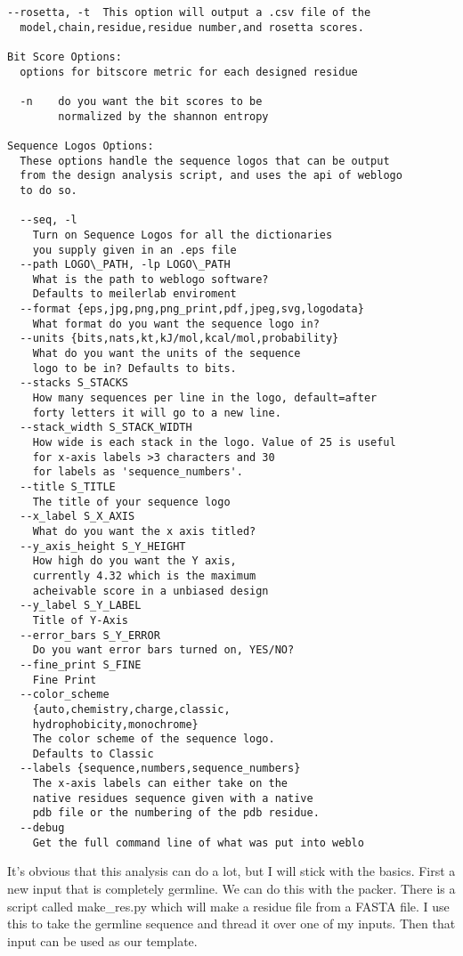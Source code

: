 \begin{lstlisting}[breaklines=true]
  --rosetta, -t  This option will output a .csv file of the
  model,chain,residue,residue number,and rosetta scores.

Bit Score Options:
  options for bitscore metric for each designed residue

  -n    do you want the bit scores to be
        normalized by the shannon entropy

Sequence Logos Options:
  These options handle the sequence logos that can be output
  from the design analysis script, and uses the api of weblogo
  to do so.

  --seq, -l
    Turn on Sequence Logos for all the dictionaries
    you supply given in an .eps file
  --path LOGO\_PATH, -lp LOGO\_PATH
    What is the path to weblogo software?
    Defaults to meilerlab enviroment
  --format {eps,jpg,png,png_print,pdf,jpeg,svg,logodata}
    What format do you want the sequence logo in?
  --units {bits,nats,kt,kJ/mol,kcal/mol,probability}
    What do you want the units of the sequence
    logo to be in? Defaults to bits.
  --stacks S_STACKS
    How many sequences per line in the logo, default=after
    forty letters it will go to a new line.
  --stack_width S_STACK_WIDTH
    How wide is each stack in the logo. Value of 25 is useful
    for x-axis labels >3 characters and 30
    for labels as 'sequence_numbers'.
  --title S_TITLE
    The title of your sequence logo
  --x_label S_X_AXIS
    What do you want the x axis titled?
  --y_axis_height S_Y_HEIGHT
    How high do you want the Y axis,
    currently 4.32 which is the maximum
    acheivable score in a unbiased design
  --y_label S_Y_LABEL
    Title of Y-Axis
  --error_bars S_Y_ERROR
    Do you want error bars turned on, YES/NO?
  --fine_print S_FINE
    Fine Print
  --color_scheme
    {auto,chemistry,charge,classic,
    hydrophobicity,monochrome}
    The color scheme of the sequence logo.
    Defaults to Classic
  --labels {sequence,numbers,sequence_numbers}
    The x-axis labels can either take on the
    native residues sequence given with a native
    pdb file or the numbering of the pdb residue.
  --debug
    Get the full command line of what was put into weblo
\end{lstlisting}

It's obvious that this analysis can do a lot, but I will stick with the basics. First a new input that is completely germline. We can do this with the packer.
There is a script called make\_res.py which will make a residue file from a FASTA file. I use this to take the germline sequence and thread it over one of my inputs. Then that input can be used as our template.

